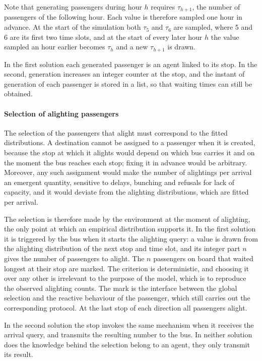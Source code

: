 \documentclass[a4paper,fleqn]{cas-sc}
\begin{document}
Note that generating passengers during hour $h$ requires $\tau_{h+1}$, the
number of passengers of the following hour. Each value is therefore sampled
one hour in advance. At the start of the simulation both $\tau_5$ and $\tau_6$
are sampled, where 5 and 6 are its first two time slots, and at the start of
every later hour $h$ the value sampled an hour earlier becomes $\tau_h$ and a
new $\tau_{h+1}$ is drawn.
 
In the first solution each generated passenger is an agent linked to its stop.
In the second, generation increases an integer counter at the stop, and the
instant of generation of each passenger is stored in a list, so that waiting
times can still be obtained.
 
\paragraph{Selection of alighting passengers}

The selection of the passengers that alight must correspond to the fitted
distributions. A destination cannot be assigned to a passenger when it is
created, because the stop at which it alights would depend on which bus
carries it and on the moment the bus reaches each stop; fixing it in advance
would be arbitrary. Moreover, any such assignment would make the number of
alightings per arrival an emergent quantity, sensitive to delays, bunching and
refusals for lack of capacity, and it would deviate from the alighting
distributions, which are fitted per arrival.
 
The selection is therefore made by the environment at the moment of alighting,
the only point at which an empirical distribution supports it. In the first
solution it is triggered by the bus when it starts the alighting query: a
value is drawn from the alighting distribution of the next stop and time slot,
and its integer part $n$ gives the number of passengers to alight. The $n$
passengers on board that waited longest at their stop are marked. The
criterion is deterministic, and choosing it over any other is irrelevant to
the purpose of the model, which is to reproduce the observed alighting counts.
The mark is the interface between the global selection and the reactive
behaviour of the passenger, which still carries out the corresponding
protocol. At the last stop of each direction all passengers alight.
 
In the second solution the stop invokes the same mechanism when it receives
the arrival query, and transmits the resulting number to the bus. In neither
solution does the knowledge behind the selection belong to an agent, they
only transmit its result.
 
\end{document}
